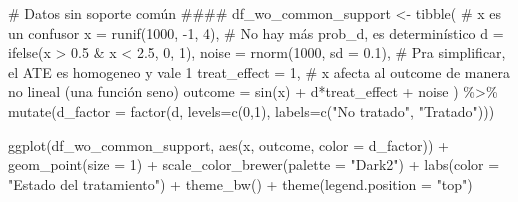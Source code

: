 \documentclass[
  letterpaper,
  DIV=11,
  numbers=noendperiod,
  oneside]{scrreprt}
\newenvironment{Shaded}{\begin{snugshade}}{\end{snugshade}}
\newcommand{\AttributeTok}[1]{\textcolor[rgb]{0.40,0.45,0.13}{#1}}
\newcommand{\CommentTok}[1]{\textcolor[rgb]{0.37,0.37,0.37}{#1}}
\newcommand{\DecValTok}[1]{\textcolor[rgb]{0.68,0.00,0.00}{#1}}
\newcommand{\FloatTok}[1]{\textcolor[rgb]{0.68,0.00,0.00}{#1}}
\newcommand{\FunctionTok}[1]{\textcolor[rgb]{0.28,0.35,0.67}{#1}}
\newcommand{\NormalTok}[1]{\textcolor[rgb]{0.00,0.23,0.31}{#1}}
\newcommand{\OtherTok}[1]{\textcolor[rgb]{0.00,0.23,0.31}{#1}}
\newcommand{\SpecialCharTok}[1]{\textcolor[rgb]{0.37,0.37,0.37}{#1}}
\newcommand{\StringTok}[1]{\textcolor[rgb]{0.13,0.47,0.30}{#1}}
\begin{document}
\begin{Shaded}
\begin{Highlighting}[]
\CommentTok{\# Datos sin soporte común \#\#\#\#}
\NormalTok{df\_wo\_common\_support }\OtherTok{\textless{}{-}} \FunctionTok{tibble}\NormalTok{(}
  \CommentTok{\# x es un confusor}
  \AttributeTok{x =} \FunctionTok{runif}\NormalTok{(}\DecValTok{1000}\NormalTok{, }\SpecialCharTok{{-}}\DecValTok{1}\NormalTok{, }\DecValTok{4}\NormalTok{),}
  \CommentTok{\# No hay más prob\_d, es determinístico}
  \AttributeTok{d =} \FunctionTok{ifelse}\NormalTok{(x }\SpecialCharTok{\textgreater{}} \FloatTok{0.5} \SpecialCharTok{\&}\NormalTok{ x }\SpecialCharTok{\textless{}} \FloatTok{2.5}\NormalTok{, }\DecValTok{0}\NormalTok{, }\DecValTok{1}\NormalTok{),}
  \AttributeTok{noise =} \FunctionTok{rnorm}\NormalTok{(}\DecValTok{1000}\NormalTok{, }\AttributeTok{sd =} \FloatTok{0.1}\NormalTok{),}
  \CommentTok{\# Pra simplificar, el ATE es homogeneo y vale 1}
  \AttributeTok{treat\_effect =} \DecValTok{1}\NormalTok{,}
  \CommentTok{\# x afecta al outcome de manera no lineal (una función seno)}
  \AttributeTok{outcome =} \FunctionTok{sin}\NormalTok{(x) }\SpecialCharTok{+}\NormalTok{ d}\SpecialCharTok{*}\NormalTok{treat\_effect }\SpecialCharTok{+}\NormalTok{ noise}
\NormalTok{) }\SpecialCharTok{\%\textgreater{}\%} 
  \FunctionTok{mutate}\NormalTok{(}\AttributeTok{d\_factor =} \FunctionTok{factor}\NormalTok{(d,}
                           \AttributeTok{levels=}\FunctionTok{c}\NormalTok{(}\DecValTok{0}\NormalTok{,}\DecValTok{1}\NormalTok{), }\AttributeTok{labels=}\FunctionTok{c}\NormalTok{(}\StringTok{"No tratado"}\NormalTok{,}
                                                   \StringTok{"Tratado"}\NormalTok{)))}

\FunctionTok{ggplot}\NormalTok{(df\_wo\_common\_support,}
       \FunctionTok{aes}\NormalTok{(x, outcome, }\AttributeTok{color =}\NormalTok{ d\_factor)) }\SpecialCharTok{+}
  \FunctionTok{geom\_point}\NormalTok{(}\AttributeTok{size =} \DecValTok{1}\NormalTok{) }\SpecialCharTok{+} 
  \FunctionTok{scale\_color\_brewer}\NormalTok{(}\AttributeTok{palette =} \StringTok{"Dark2"}\NormalTok{) }\SpecialCharTok{+}
  \FunctionTok{labs}\NormalTok{(}\AttributeTok{color =} \StringTok{"Estado del tratamiento"}\NormalTok{) }\SpecialCharTok{+}
  \FunctionTok{theme\_bw}\NormalTok{() }\SpecialCharTok{+}
  \FunctionTok{theme}\NormalTok{(}\AttributeTok{legend.position =} \StringTok{"top"}\NormalTok{)}
\end{Highlighting}
\end{Shaded}
\end{document}
